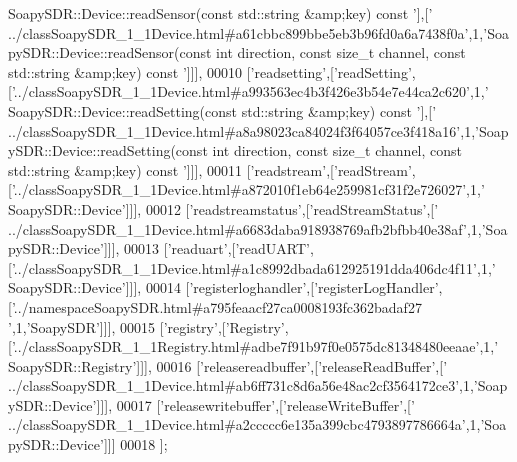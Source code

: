 \begin{DoxyCode}
{      SoapySDR::Device::readSensor(const std::string &amp;key) const '}],[\textcolor{stringliteral}{'
      ../classSoapySDR\_1\_1Device.html#a61cbbc899bbe5eb3b96fd0a6a7438f0a'},1,\textcolor{stringliteral}{'SoapySDR::Device::readSensor(const int direction, const size\_t channel, const
       std::string &amp;key) const '}]]],
00010   [\textcolor{stringliteral}{'readsetting'},[\textcolor{stringliteral}{'readSetting'},[\textcolor{stringliteral}{'../classSoapySDR\_1\_1Device.html#a993563ec4b3f426e3b54e7e44ca2c620'},1,\textcolor{stringliteral}{'
      SoapySDR::Device::readSetting(const std::string &amp;key) const '}],[\textcolor{stringliteral}{'
      ../classSoapySDR\_1\_1Device.html#a8a98023ca84024f3f64057ce3f418a16'},1,\textcolor{stringliteral}{'SoapySDR::Device::readSetting(const int direction, const size\_t channel, const
       std::string &amp;key) const '}]]],
00011   [\textcolor{stringliteral}{'readstream'},[\textcolor{stringliteral}{'readStream'},[\textcolor{stringliteral}{'../classSoapySDR\_1\_1Device.html#a872010f1eb64e259981cf31f2e726027'},1,\textcolor{stringliteral}{'
      SoapySDR::Device'}]]],
00012   [\textcolor{stringliteral}{'readstreamstatus'},[\textcolor{stringliteral}{'readStreamStatus'},[\textcolor{stringliteral}{'
      ../classSoapySDR\_1\_1Device.html#a6683daba918938769afb2bfbb40e38af'},1,\textcolor{stringliteral}{'SoapySDR::Device'}]]],
00013   [\textcolor{stringliteral}{'readuart'},[\textcolor{stringliteral}{'readUART'},[\textcolor{stringliteral}{'../classSoapySDR\_1\_1Device.html#a1c8992dbada612925191dda406dc4f11'},1,\textcolor{stringliteral}{'
      SoapySDR::Device'}]]],
00014   [\textcolor{stringliteral}{'registerloghandler'},[\textcolor{stringliteral}{'registerLogHandler'},[\textcolor{stringliteral}{'../namespaceSoapySDR.html#a795feaacf27ca0008193fc362badaf27
      '},1,\textcolor{stringliteral}{'SoapySDR'}]]],
00015   [\textcolor{stringliteral}{'registry'},[\textcolor{stringliteral}{'Registry'},[\textcolor{stringliteral}{'../classSoapySDR\_1\_1Registry.html#adbe7f91b97f0e0575dc81348480eeaae'},1,\textcolor{stringliteral}{'
      SoapySDR::Registry'}]]],
00016   [\textcolor{stringliteral}{'releasereadbuffer'},[\textcolor{stringliteral}{'releaseReadBuffer'},[\textcolor{stringliteral}{'
      ../classSoapySDR\_1\_1Device.html#ab6ff731c8d6a56e48ac2cf3564172ce3'},1,\textcolor{stringliteral}{'SoapySDR::Device'}]]],
00017   [\textcolor{stringliteral}{'releasewritebuffer'},[\textcolor{stringliteral}{'releaseWriteBuffer'},[\textcolor{stringliteral}{'
      ../classSoapySDR\_1\_1Device.html#a2ccccc6e135a399cbc4793897786664a'},1,\textcolor{stringliteral}{'SoapySDR::Device'}]]]
00018 ];
\end{DoxyCode}
